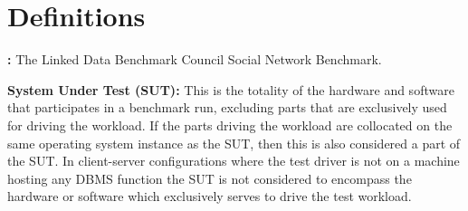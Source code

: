 \chapter*{Definitions}

%
%
%
%
%
%
%
%
%
%

{\flushleft \textbf{\ldbcsnb:}} The Linked Data Benchmark Council Social Network Benchmark. 



{\flushleft \textbf{System Under Test (SUT):}} This is the totality of the hardware and software that participates in a benchmark run, excluding parts that are exclusively used for driving the workload. If the parts driving the workload are collocated on the same operating system instance as the SUT, then this is also considered a part of the SUT. In client-server configurations where the test driver is not on a machine hosting any DBMS function the SUT is not considered to encompass the hardware or software which exclusively serves to drive the test workload.

